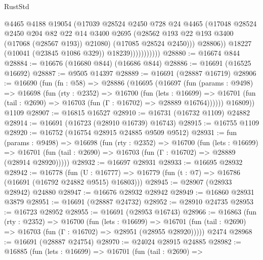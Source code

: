 \begin{lexlean}{RustStd}
\begin{coremodule}
                              @4465
                              @4188
                              @19054
                              (@17039
                                @28524
                                @2450
                                @728
                                @24
                                @4465
                                (@17048
                                  @28524
                                  @2450
                                  @204
                                  @82
                                  @22
                                  @14
                                  @3400
                                  @2695
                                  (@28562 @193 @22 @193 @3400 (@17068 (@28567 @193)) @21080)
                                  (@17085 @28524 @2450)))
                              @28806))
                          @18227
                          (@10041 (@23845 @1086 @329))
                          @18239)))))))))))
@28880 := @16674 @844
@28884 := @16676 (@16680 @844) (@16686 @844)
@28886 := @16691 (@16525 @16692)
@28887 := @9505 @14397
@28889 := @16691 (@28887 @16719)
@28906 := @16690
    (fun (fn : @58) =>
    @28886
      (@16695
        (@16697
          (fun (params : @9498) =>
          @16698
            (fun (rty : @2352) =>
            @16700
              (fun (lets : @16699) =>
              @16701 (fun (tail : @2690) => @16703 (fun (Γ : @16702) => @28889 @16764))))))
        @16809))
    @1109
@28907 := @16815 @16527
@28910 := @16731 (@16732 @1109) @24882
@28914 := @16691 (@16723 (@28910 @16739) @16743)
@28915 := @16755 @1109
@28920 := @16752 (@16754 @28915 @24885 @9509 @9512)
@28931 := fun (params : @9498) =>
  @16698
    (fun (rty : @2352) =>
    @16700
      (fun (lets : @16699) =>
      @16701 (fun (tail : @2690) => @16703 (fun (Γ : @16702) => @28889 (@28914 @28920)))))
@28932 := @16697 @28931
@28933 := @16695 @28932
@28942 := @16778
    (fun (U : @16777) => @16779 (fun (t : @7) => @16786 (@16691 (@16792 @24882 @9515) @16803)))
@28945 := @28907 (@28933 @28942) @24880
@28947 := @16676 @28932 @28942
@28949 := @16860 @28931 @3879
@28951 := @16691 (@28887 @24732)
@28952 := @28910 @24735
@28953 := @16723 @28952
@28955 := @16691 (@28953 @16743)
@28966 := @16863
    (fun (rty : @2352) =>
    @16700
      (fun (lets : @16699) =>
      @16701 (fun (tail : @2690) => @16703 (fun (Γ : @16702) => @28951 (@28955 @28920)))))
    @2474
@28968 := @16691 (@28887 @24754)
@28970 := @24024 @28915 @24885
@28982 := @16885
    (fun (lets : @16699) =>
    @16701
      (fun (tail : @2690) =>

\end{coremodule}
\end{lexlean}
